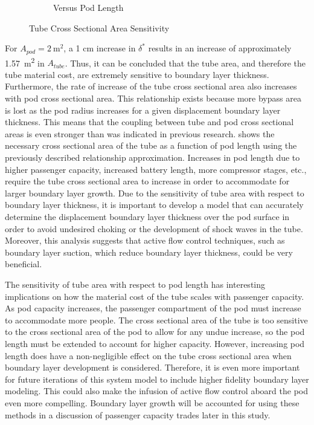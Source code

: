 \begin{figure}
\begin{subfigure}{.5\textwidth}
  \caption{Versus Pod Length}
  \label{fig:tube_area_vs_length}
\end{subfigure}
\caption{Tube Cross Sectional Area Sensitivity}
\label{fig:topTubeArea}
\end{figure}

For $A_{pod} = \SI{2}{\metre\squared}$, a 1 cm increase in $\delta^{*}$
results in an increase of approximately \SI{1.57}{\metre\squared} in $A_{tube}$.
Thus, it can be concluded that the tube area, and therefore the tube material cost,
are extremely sensitive to boundary layer thickness. Furthermore, the rate of
increase of the tube cross sectional area also increases with pod cross sectional area.
This relationship exists because more bypass area is lost as the pod radius
increases for a given displacement boundary layer thickness. This means that
the coupling between tube and pod cross sectional areas is even stronger than
was indicated in previous research.
 shows the necessary cross sectional area of the
tube as a function of pod length using the previously described relationship
approximation. Increases in pod length due to higher passenger
capacity, increased battery length, more compressor stages, etc., require the
tube cross sectional area to increase in order to accommodate for larger
boundary layer growth.
Due to the sensitivity of tube area with respect to boundary layer thickness,
it is important to develop a model that can accurately determine the
displacement boundary layer thickness over the pod surface in order to avoid
undesired choking or the development of shock waves in the tube. Moreover,
this analysis suggests that active flow control techniques, such as boundary
layer suction, which reduce boundary layer thickness, could be very beneficial.

The sensitivity of tube area with respect to pod length has interesting
implications on how the material cost of the tube scales with passenger capacity.
As pod capacity increases, the passenger compartment of the pod must increase
to accommodate more people. The cross sectional area of the tube is too
sensitive to the cross sectional area of the pod to allow for any undue
increase, so the pod length must be extended to account for higher capacity.
However, increasing pod length does have a non-negligible effect on the tube
cross sectional area when boundary layer development is considered. Therefore,
it is even more important for future iterations of this system model to include
higher fidelity boundary layer modeling. This could also make the infusion of
active flow control aboard the pod even more compelling. Boundary layer growth
will be accounted for using these methods in a discussion of passenger capacity
trades later in this study.
